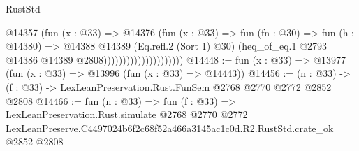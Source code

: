 \begin{lexlean}{RustStd}
\begin{coremodule}
                                      @14357
                                        (fun (x : @33) =>
                                        @14376
                                          (fun (x : @33) =>
                                          fun (fn : @30) =>
                                          fun (h : @14380) =>
                                          @14388
                                            @14389
                                            (Eq.refl.{2} (Sort 1) @30)
                                            (heq_of_eq.{1}
                                              @2793
                                              @14386
                                              @14389
                                              @2808)))))))))))))))))))))
@14448 := fun (x : @33) => @13977 (fun (x : @33) => @13996 (fun (x : @33) => @14443))
@14456 := (n : @33) -> (f : @33) -> LexLeanPreservation.Rust.FunSem @2768 @2770 @2772 @2852 @2808
@14466 := fun (n : @33) =>
  fun (f : @33) =>
  LexLeanPreservation.Rust.simulate
    @2768
    @2770
    @2772
    LexLeanPreserve.C4497024b6f2c68f52a466a3145ac1c0d.R2.RustStd.crate_ok
    @2852
    @2808
\end{coremodule}
\end{lexlean}
